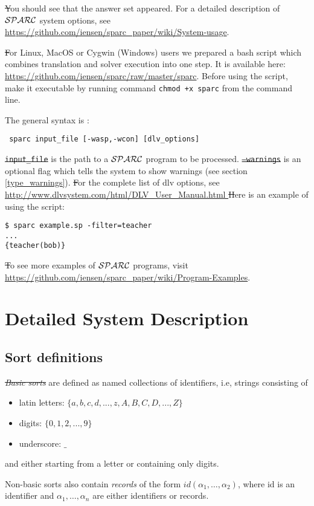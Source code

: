 \documentclass[12pt, letterpaper]{article}
\begin{document}
\st You should see that the answer set appeared. For a detailed description of ${\cal SPARC}$ system options, see 
\url{https://github.com/iensen/sparc_paper/wiki/System-usage}.

\st For Linux, MacOS or Cygwin (Windows) users we prepared a bash script which combines translation and solver execution into one step.
It is available here: \url{https://github.com/iensen/sparc/raw/master/sparc}. Before using the script, make it executable by running command
\texttt{chmod +x sparc} from the command line.

The general syntax is :
\begin{verbatim}
 sparc input_file [-wasp,-wcon] [dlv_options]
\end{verbatim}
\st
\texttt{input\_file} is the path to a ${\cal SPARC}$ program to be processed. 
\st
\texttt{--warnings} is an optional flag which tells the system to show warnings 
(see section \ref{type_warnings}).
\st
For the complete list of dlv options, see 
\url{http://www.dlvsystem.com/html/DLV_User_Manual.html }
\st
Here is an example of using the script:
\begin{verbatim}
$ sparc example.sp -filter=teacher
...
{teacher(bob)}
\end{verbatim}
\st To see more examples of ${\cal SPARC}$ programs, visit \url{https://github.com/iensen/sparc_paper/wiki/Program-Examples}.
\section{Detailed System Description}

\subsection{Sort definitions}\label{ss}



\st \textit{Basic sorts} are defined as named collections of identifiers, i.e, strings consisting of
\begin{itemize}
 \item latin letters: $\{a,b,c,d,...,z,A,B,C,D,...,Z\}$
 \item digits: $\{0,1,2,...,9\}$
 \item underscore: $\_$
\end{itemize}
and either starting from a letter or containing only digits.

Non-basic sorts also contain \textit{records} of the form $id(\alpha_1,\dots, \alpha_2)$, where id is an identifier and 
$\alpha_1, \dots, \alpha_n$ are either identifiers or records. 
\end{document}

